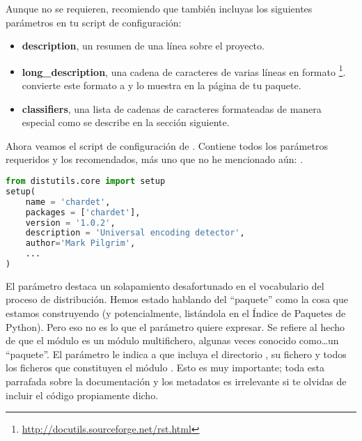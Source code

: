 Aunque no se requieren, recomiendo que también incluyas los siguientes parámetros en tu script de configuración:

\begin{itemize}
  \item \textbf{description}, un resumen de una línea sobre el proyecto.
  \item \textbf{long\_description}, una cadena de caracteres de varias líneas en formato \footnote{\href{http://docutils.sourceforge.net/rst.html}{http://docutils.sourceforge.net/rst.html}}.  convierte este formato a  y lo muestra en la página de tu paquete.
  \item \textbf{classifiers}, una lista de cadenas de caracteres formateadas de manera especial como se describe en la sección siguiente.
\end{itemize}


Ahora veamos el script de configuración de . Contiene todos los parámetros requeridos y los recomendados, más uno que no he mencionado aún: .


\begin{lstlisting}[language=Python,breaklines=true]
from distutils.core import setup
setup(
    name = 'chardet',
    packages = ['chardet'],
    version = '1.0.2',
    description = 'Universal encoding detector',
    author='Mark Pilgrim',
    ...
)
\end{lstlisting}

El parámetro  destaca un solapamiento desafortunado en el vocabulario del proceso de distribución. Hemos estado hablando del ``paquete'' como la cosa que estamos construyendo (y potencialmente, listándola en el Índice de Paquetes de Python). Pero eso no es lo que el parámetro  quiere expresar. Se refiere al hecho de que el módulo  es un módulo multifichero, algunas veces conocido como\ldots un ``paquete''. El parámetro  le indica a  que incluya el directorio , su fichero  y todos los ficheros  que constituyen el módulo . Esto es muy importante; toda esta parrafada sobre la documentación y los metadatos es irrelevante si te olvidas de incluir el código propiamente dicho.

